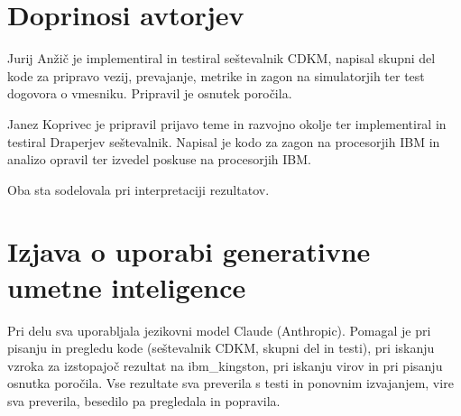 \section*{Doprinosi avtorjev}

Jurij Anžič je implementiral in testiral seštevalnik CDKM, napisal skupni del kode za pripravo vezij, prevajanje, metrike in zagon na simulatorjih ter test dogovora o vmesniku. Pripravil je osnutek poročila.

Janez Koprivec je pripravil prijavo teme in razvojno okolje ter implementiral in testiral Draperjev seštevalnik. Napisal je kodo za zagon na procesorjih IBM in analizo opravil ter izvedel poskuse na procesorjih IBM.

Oba sta sodelovala pri interpretaciji rezultatov.

\section*{Izjava o uporabi generativne umetne inteligence}

Pri delu sva uporabljala jezikovni model Claude (Anthropic). Pomagal je pri pisanju in pregledu kode (seštevalnik CDKM, skupni del in testi), pri iskanju vzroka za izstopajoč rezultat na ibm\_kingston, pri iskanju virov in pri pisanju osnutka poročila. Vse rezultate sva preverila s testi in ponovnim izvajanjem, vire sva preverila, besedilo pa pregledala in popravila.
